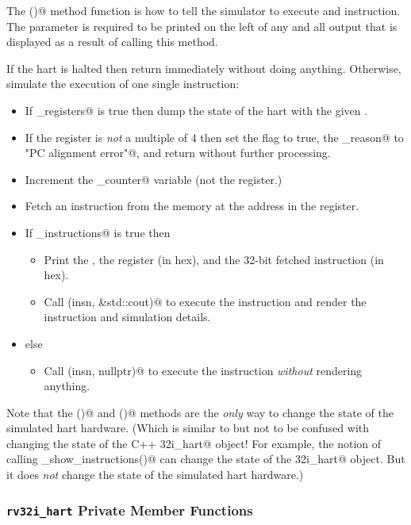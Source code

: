 \documentclass{article}
\begin{document}
\begin{itemize}
The \verb@tick()@ method function is how to tell the simulator to execute
and instruction.  The \verb@hdr@ parameter is required to be printed on the left
of any and all output that is displayed as a result of calling this method.

If the hart is halted then return immediately without doing anything.
Otherwise, simulate the execution of one single instruction:

\begin{itemize}
\item If \verb@show_registers@ is true then dump the state of the hart with the given \verb@hdr@.
\item If the \verb@pc@ register is {\em not} a multiple of 4 then set the \verb@halt@ flag to true,
	the \verb@halt_reason@ to \verb@"PC alignment error"@, and return without further processing.
\item Increment the \verb@insn_counter@ variable (not the \verb@pc@ register.)
\item Fetch an instruction from the memory at the address in the \verb@pc@ register.
\item If \verb@show_instructions@ is true then
\begin{itemize}
\item Print the \verb@hdr@, the \verb@pc@ register (in hex), and the 32-bit fetched instruction (in hex).
\item Call \verb@exec(insn, &std::cout)@ to execute the instruction and render the instruction and simulation details.
\end{itemize}
\item else
\begin{itemize}
\item Call \verb@exec(insn, nullptr)@ to execute the instruction {\em without} rendering anything.
\end{itemize}
\end{itemize}

Note that the \verb@reset()@ and \verb@tick()@ methods are the {\em only} 
way to change the state of the simulated hart hardware. (Which is similar 
to but not to be confused with changing the state of the C++ \verb@rv32i_hart@ object!
For example, the notion of calling \verb@set_show_instructions()@ can change the
state of the \verb@rv32i_hart@ object.  But it does {\em not} change the state
of the simulated hart hardware.)


\subsubsection{{\tt rv32i\_hart} Private Member Functions}







\end{itemize}
\end{document}
